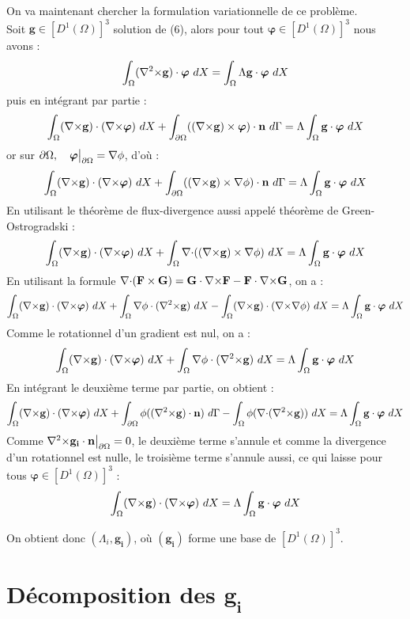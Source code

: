 On va maintenant chercher la formulation variationnelle de ce problème.\\
Soit $\mathbf{g}\in [D^1(\Omega)]^3$ solution de (6), alors pour tout $\bm{\varphi}\in [D^1(\Omega)]^3$ nous avons :
\[ \int_\Omega ({\nabla^2\times} \mathbf{g})\cdot\bm{\varphi}\ dX = \int_\Omega\Lambda \mathbf{g}\cdot\bm{\varphi}\ dX \]
puis en intégrant par partie :
\[ \int_\Omega ({\nabla\times} \mathbf{g})\cdot({\nabla\times}\bm{\varphi})\ dX + \int_{\partial\Omega} (({\nabla\times} \mathbf{g})\times \bm{\varphi})\cdot \mathbf{n}\ d\Gamma = \Lambda\int_\Omega \mathbf{g}\cdot\bm{\varphi}\ dX \]
or sur $\partial\Omega,\quad \bm{\varphi}{\big\rvert_{\partial\Omega}}={\nabla}\phi$, d'où :
\[ \int_\Omega ({\nabla\times} \mathbf{g})\cdot({\nabla\times}\bm{\varphi})\ dX + \int_{\partial\Omega} (({\nabla\times} \mathbf{g})\times {\nabla}\phi)\cdot \mathbf{n}\ d\Gamma = \Lambda\int_\Omega \mathbf{g}\cdot\bm{\varphi}\ dX \]
En utilisant le théorème de flux-divergence aussi appelé théorème de Green-Ostrogradski :
\[ \int_\Omega ({\nabla\times} \mathbf{g})\cdot({\nabla\times}\bm{\varphi})\ dX + \int_\Omega {\nabla\cdot}(({\nabla\times} \mathbf{g})\times {\nabla}\phi)\ dX = \Lambda\int_\Omega \mathbf{g}\cdot\bm{\varphi}\ dX \]
En utilisant la formule ${\nabla\cdot}(\mathbf{F}\times \mathbf{G}) = \mathbf{G}\cdot {\nabla\times} \mathbf{F} - \mathbf{F}\cdot {\nabla\times} \mathbf{G}$, on a :
\[ \int_\Omega (\rot \mathbf{g})\cdot(\rot\bm{\varphi})\ dX + \int_\Omega \grad\phi\cdot(\rott \mathbf{g})\ dX -\int_\Omega (\rot \mathbf{g})\cdot (\rot\grad\phi)\ dX  = \Lambda\int_\Omega \mathbf{g}\cdot\bm{\varphi}\ dX \]
Comme le rotationnel d'un gradient est nul, on a :
\[ \int_\Omega ({\nabla\times} \mathbf{g})\cdot({\nabla\times}\bm{\varphi})\ dX + \int_\Omega {\nabla}\phi\cdot({\nabla^2\times} \mathbf{g})\ dX  = \Lambda\int_\Omega \mathbf{g}\cdot\bm{\varphi}\ dX \]
En intégrant le deuxième terme par partie, on obtient :
\[ \int_\Omega ({\nabla\times} \mathbf{g})\cdot({\nabla\times}\bm{\varphi})\ dX + \int_{\partial\Omega} \phi(({\nabla^2\times} \mathbf{g})\cdot \mathbf{n})\ d\Gamma - \int_\Omega \phi({\nabla\cdot}({\nabla^2\times} \mathbf{g}))\ dX  = \Lambda\int_\Omega \mathbf{g}\cdot\bm{\varphi}\ dX \]
Comme ${\nabla^2\times}  \mathbf{g_i}\cdot \mathbf{n}{\big\rvert_{\partial\Omega}} = 0$, le deuxième terme s'annule et comme la divergence d'un rotationnel est nulle, le troisième terme s'annule aussi, ce qui laisse pour tous $\bm{\varphi}\in [D^1(\Omega)]^3$ :
\begin{equation}\label{fveigen}
\int_\Omega ({\nabla\times} \mathbf{g})\cdot({\nabla\times}\bm{\varphi})\ dX = \Lambda\int_\Omega \mathbf{g}\cdot\bm{\varphi}\ dX
\end{equation}

On obtient donc $(\Lambda_i,\mathbf{g_i})$, où $(\mathbf{g_i})$ forme une base de $[D^1(\Omega)]^3$.
\section{Décomposition des $\mathbf{g_i}$}
\label{decomp}


